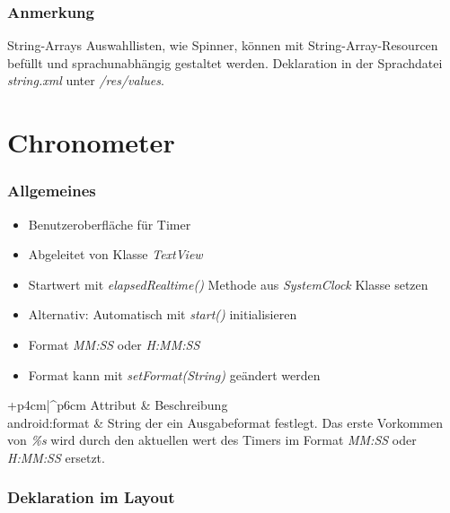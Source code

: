 \begin{frame}
   \frametitle{Anmerkung}
	\begin{alertblock}{String-Arrays}
		Auswahllisten, wie Spinner, können mit String-Array-Resourcen befüllt und 
		sprachunabhängig gestaltet werden. Deklaration in der Sprachdatei 
		\emph{string.xml} unter \emph{/res/values}. 

		\vspace{3mm}

		
	\end{alertblock}
\end{frame}

\section{Chronometer}
\begin{frame}[label=chronometer]
   \frametitle{Allgemeines}
   \begin{itemize}
      \item Benutzeroberfläche für Timer
      \item Abgeleitet von Klasse \emph{TextView}
      \item Startwert mit \emph{elapsedRealtime()} Methode aus 
         \emph{SystemClock} Klasse setzen
      \item Alternativ: Automatisch mit \emph{start()} initialisieren
      \item Format \emph{MM:SS} oder \emph{H:MM:SS}
      \item Format kann mit \emph{setFormat(String)} geändert werden
   \end{itemize}

   \begin{attrDesc}{+p{4cm}|^p{6cm}}
      Attribut & Beschreibung\\
      \hline
      android:format & String der ein Ausgabeformat festlegt. Das erste Vorkommen 
         von \emph{\%s} wird durch den aktuellen wert des Timers im Format 
         \emph{MM:SS} oder \emph{H:MM:SS} ersetzt.\\
   \end{attrDesc}
\end{frame}

\begin{frame}
   \frametitle{Deklaration im Layout}
   
\end{frame}

